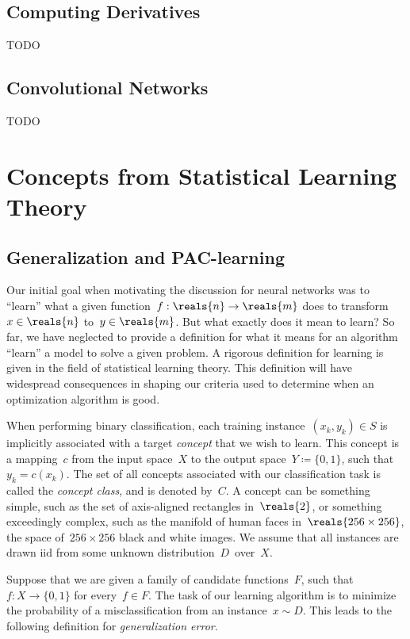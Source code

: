 \documentclass[11pt,a4paper]{article}
\numberwithin{equation}{section}
\begin{document}
\subsection{Computing Derivatives}
\label{sec:computing_derivatives}

TODO

\subsection{Convolutional Networks}

TODO

\section{Concepts from Statistical Learning Theory}

\subsection{Generalization and PAC-learning}

Our initial goal when motivating the discussion for neural networks was to
``learn'' what a given function~$f: \reals{n} \to \reals{m}$ does to
transform~$x \in \reals{n}$ to~$y \in \reals{m}$. But what exactly does it mean
to learn?  So far, we have neglected to provide a definition for what it means
for an algorithm ``learn'' a model to solve a given problem. A rigorous
definition for learning is given in the field of statistical learning theory.
This definition will have widespread consequences in shaping our criteria used
to determine when an optimization algorithm is good.

When performing binary classification, each training instance~$(x_k, y_k) \in S$
is implicitly associated with a target \emph{concept} that we wish to learn.
This concept is a mapping~$c$ from the input space~$X$ to the output space~$Y
\coloneqq \{0, 1\}$, such that~$y_k = c(x_k)$. The set of all concepts
associated with our classification task is called the \emph{concept class}, and
is denoted by~$C$. A concept can be something simple, such as the set of
axis-aligned rectangles in~$\reals{2}$, or something exceedingly complex, such
as the manifold of human faces in~$\reals{256 \times 256}$, the space of~$256
\times 256$ black and white images. We assume that all instances are drawn iid
from some unknown distribution~$D$~over~$X$.

Suppose that we are given a family of candidate functions~$F$, such that~$f : X
\to \{0, 1\}$ for every~$f \in F$. The task of our learning algorithm is to
minimize the probability of a misclassification from an instance~$x \sim D$.
This leads to the following definition for \emph{generalization error}.
\end{document}
